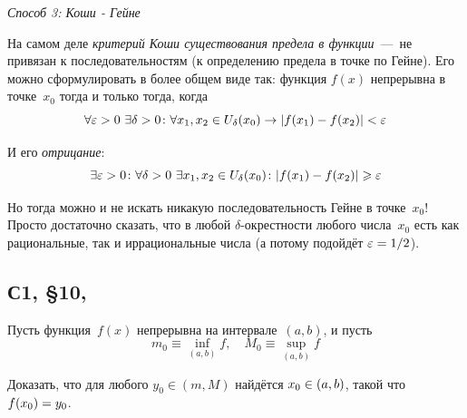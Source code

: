 \documentclass[a4paper,12pt]{article}
\begin{document}
\begin{solution}
    \medskip
    
    \emph{Способ 3: Коши - Гейне}

    На самом деле \emph{критерий Коши существования предела в функции}~---~не привязан к последовательностям (к определению предела в точке по Гейне).
    Его можно сформулировать в более общем виде так: функция $f(x)$ непрерывна в точке~$x_0$ тогда и только тогда, когда
    \[
      \forall \varepsilon > 0\ \exists \delta > 0\colon \forall x_1, x_2 \in U_{\delta}(x_0) \to |f(x_1) - f(x_2)| < \varepsilon
    \]

    И его \emph{отрицание}:
    \[
      \exists \varepsilon > 0\colon \forall \delta > 0\ \exists x_1, x_2 \in U_{\delta}(x_0)\colon |f(x_1) - f(x_2)| \geqslant \varepsilon
    \]

    Но тогда можно и не искать никакую последовательность Гейне в точке~$x_0$!
    Просто достаточно сказать, что в любой $\delta$-окрестности любого числа~$x_0$ есть как рациональные, так и иррациональные числа (а потому подойдёт $\eps \hm= 1 \hm/ 2$).
  \end{solution}


  \subsection{С1, \S 10, }

  Пусть функция~$f(x)$ непрерывна на интервале~$(a, b)$, и пусть
  \[
    m_0 \equiv \inf_{(a, b)} f,\quad M_0 \equiv \sup_{(a, b)} f
  \]

  Доказать, что для любого $y_0 \in (m, M)$ найдётся $x_0 \hm\in (a, b)$, такой что $f(x_0) \hm= y_0$.
  
\end{document}
